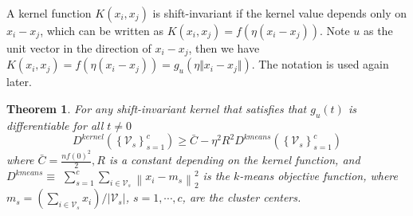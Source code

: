 \documentclass[12pt, a4paper, oneside]{article}
\newtheorem{theorem}{Theorem}
\begin{document}
A kernel function $K(x_i, x_j)$ is shift-invariant if the kernel value depends only
on $x_i - x_j$, which can be written as $K(x_i, x_j) = f(\eta(x_i - x_j))$. Note $u$ as the unit vector in the direction of $x_i - x_j$, then we have $K(x_i, x_j) = f(\eta(x_i - x_j)) = g_u(\eta \Vert x_i - x_j\Vert)$. The notation is used again later.

\begin{theorem}
	\label{thm:km}
	For any shift-invariant kernel that satisfies that $g_{u}(t)$ is differentiable for all $t \neq 0$
	$$
	D^{k e r n e l}\left(\left\{\mathcal{V}_{s}\right\}_{s=1}^{c}\right) \geq \bar{C}-\eta^{2} R^{2} D^{k m e a n s}\left(\left\{\mathcal{V}_{s}\right\}_{s=1}^{c}\right)
	$$
	where $\bar{C}=\frac{n f(0)^{2}}{2}, R$ is a constant depending on the kernel function, and \\ $D^{k m e a n s} \equiv$ $\sum_{s=1}^{c} \sum_{i \in \mathcal{V}_{s}}\left\|x_{i}-m_{s}\right\|_{2}^{2}$ is the $k$-means objective function, where $m_{s}=\left(\sum_{i \in \mathcal{V}_{s}} x_{i}\right) /\left|\mathcal{V}_{s}\right|$, $s=1, \cdots, c$, are the cluster centers.
\end{theorem}
\end{document}
